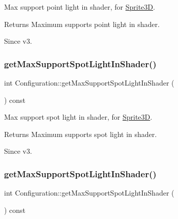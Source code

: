 Max support point light in shader, for \hyperlink{classSprite3D}{Sprite3D}.

\begin{DoxyReturn}{Returns}
Maximum supports point light in shader. 
\end{DoxyReturn}
\begin{DoxySince}{Since}
v3. 
\end{DoxySince}
\mbox{\label{classConfiguration_a103e36372191a3a0046728d3e8476601}} 
\subsubsection{\texorpdfstring{get\+Max\+Support\+Spot\+Light\+In\+Shader()}{getMaxSupportSpotLightInShader()}\hspace{0.1cm}{\footnotesize\ttfamily [1/2]}}
{\footnotesize\ttfamily int Configuration\+::get\+Max\+Support\+Spot\+Light\+In\+Shader (\begin{DoxyParamCaption}{ }\end{DoxyParamCaption}) const}

Max support spot light in shader, for \hyperlink{classSprite3D}{Sprite3D}.

\begin{DoxyReturn}{Returns}
Maximum supports spot light in shader. 
\end{DoxyReturn}
\begin{DoxySince}{Since}
v3. 
\end{DoxySince}
\mbox{\label{classConfiguration_a103e36372191a3a0046728d3e8476601}} 
\subsubsection{\texorpdfstring{get\+Max\+Support\+Spot\+Light\+In\+Shader()}{getMaxSupportSpotLightInShader()}\hspace{0.1cm}{\footnotesize\ttfamily [2/2]}}
{\footnotesize\ttfamily int Configuration\+::get\+Max\+Support\+Spot\+Light\+In\+Shader (\begin{DoxyParamCaption}{ }\end{DoxyParamCaption}) const}

